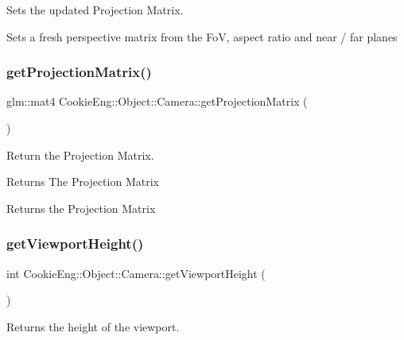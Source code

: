 Sets the updated Projection Matrix. 

Sets a fresh perspective matrix from the FoV, aspect ratio and near / far planes \mbox{\label{class_cookie_eng_1_1_object_1_1_camera_afa69ef269138610423e2dc8707720500}} 
\subsubsection{\texorpdfstring{get\+Projection\+Matrix()}{getProjectionMatrix()}}
{\footnotesize\ttfamily glm\+::mat4 Cookie\+Eng\+::\+Object\+::\+Camera\+::get\+Projection\+Matrix (\begin{DoxyParamCaption}{ }\end{DoxyParamCaption})\hspace{0.3cm}{\ttfamily [inline]}}



Return the Projection Matrix. 

\begin{DoxyReturn}{Returns}
The Projection Matrix
\end{DoxyReturn}
Returns the Projection Matrix \mbox{\label{class_cookie_eng_1_1_object_1_1_camera_ad3cd942d665b97a64e19b68b5d0fe6fb}} 
\subsubsection{\texorpdfstring{get\+Viewport\+Height()}{getViewportHeight()}}
{\footnotesize\ttfamily int Cookie\+Eng\+::\+Object\+::\+Camera\+::get\+Viewport\+Height (\begin{DoxyParamCaption}{ }\end{DoxyParamCaption})\hspace{0.3cm}{\ttfamily [inline]}}



Returns the height of the viewport. 

